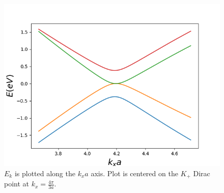 \documentclass{article}
\begin{document}
\begin{figure}[h]
\centering
\includegraphics[scale=.62]{bilayer_band_kpos}
\caption{$E_{k}$ is plotted along the $k_{x}a$ axis. Plot is centered on the $K_{+}$ Dirac point at $k_{x} = \frac{4\pi}{3a}$. }
\end{figure}
\end{document}
